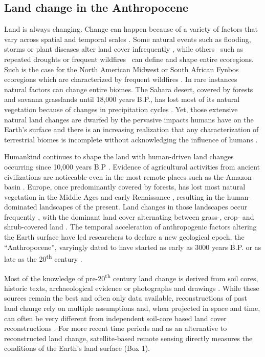 \subsection{Land change in the Anthropocene}
\label{C01_0101}

Land is always changing. Change can happen because of a variety of factors that vary across spatial and temporal scales \citep{Lambin2003,Kennedy2014}. Some natural events such as flooding, storms or plant diseases alter land cover infrequently \citep{Turner1998}, while others \textendash\ such as repeated droughts or frequent wildfires \textendash\ can define and shape entire ecoregions. Such is the case for the North American Midwest or South African Fynbos ecoregions which are characterized by frequent wildfires \citep{Westerling2006,Kelly2017}. In rare instances natural factors can change entire biomes. The Sahara desert, covered by forests and savanna grasslands until 18,000 years B.P., has lost most of its natural vegetation because of changes in precipitation cycles \citep{Hamilton1981}. Yet, those extensive natural land changes are dwarfed by the pervasive impacts humans have on the Earth’s surface and there is an increasing realization that any characterization of terrestrial biomes is incomplete without acknowledging the influence of humans \citep{Ellis2008,Kehoe2017}.

Humankind continues to shape the land \citep{Ellis2011,Ellis2013} with human-driven land changes occurring since 10,000 years B.P \citep{Ellis2013}. Evidence of agricultural activities from ancient civilizations are noticeable even in the most remote places such as the Amazon basin \citep{McMichael2017}. Europe, once predominantly covered by forests, has lost most natural vegetation in the Middle Ages and early Renaissance \citep{Kaplan2009}, resulting in the human-dominated landscapes of the present. Land changes in those landscapes occur frequently \citep{Kleyer2007}, with the dominant land cover alternating between grass-, crop- and shrub-covered land \citep{Kleyer2007,Manning2009}. The temporal acceleration of anthropogenic factors altering the Earth surface \citep{Steffen2015} have led researchers to declare a new geological epoch, the “Anthropocene”, varyingly dated to have started as early as 3000 years B.P. or as late as the 20\textsuperscript{th} century \citep{Ellis2013a}. 

Most of the knowledge of pre-20\textsuperscript{th} century land change is derived from soil cores, historic texts, archaeological evidence or photographs and drawings \citep{KleinGoldewijk2011,KleinGoldewijk2016}. While these sources remain the best and often only data available, reconstructions of past land change rely on multiple assumptions \citep{KleinGoldewijk2013} and, when projected in space and time, can often be very different from independent soil-core based land cover reconstructions \citep{Kaplan2017}. For more recent time periods and as an alternative to reconstructed land change, satellite-based remote sensing directly measures the conditions of the Earth's land surface (Box 1).

